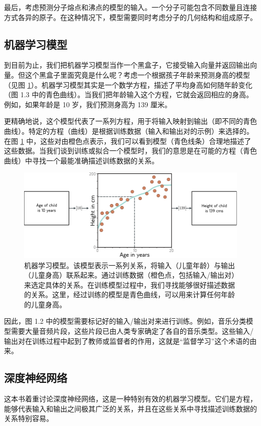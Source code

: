 \documentclass[lang=cn,newtx,10pt,scheme=chinese]{elegantbook}
\begin{document}
最后，考虑预测分子熔点和沸点的模型的输入。一个分子可能包含不同数量且连接方式各异的原子。在这种情况下，模型需要同时考虑分子的几何结构和组成原子。

\subsection{机器学习模型}
到目前为止，我们把机器学习模型当作一个黑盒子，它接受输入向量并返回输出向量。但这个黑盒子里面究竟是什么呢？考虑一个根据孩子年龄来预测身高的模型（见图 \ref{IntroAgeHeight}）。机器学习模型其实是一个数学方程，描述了平均身高如何随年龄变化（图 1.3 中的青色曲线）。当我们把年龄输入这个方程，它就会返回相应的身高。例如，如果年龄是 10 岁，我们预测身高为 139 厘米。

更精确地说，这个模型代表了一系列方程，用于将输入映射到输出（即不同的青色曲线）。特定的方程（曲线）是根据训练数据（输入和输出对的示例）来选择的。在图 \ref{IntroAgeHeight} 中，这些对由橙色点表示，我们可以看到模型（青色线条）合理地描述了这些数据。当我们谈到训练或拟合一个模型时，我们的意思是在可能的方程（青色曲线）中寻找一个最能准确描述训练数据的关系。

\begin{figure}
	\centering
	\includegraphics[width=0.7\linewidth]{PDFFigures/UDLChap1PDF/IntroAgeHeight.pdf}
	\caption{机器学习模型。该模型表示一系列关系，将输入（儿童年龄）与输出（儿童身高）联系起来。通过训练数据（橙色点，包括输入/输出对）来选定具体的关系。在训练模型过程中，我们寻找能够很好描述数据的关系。这里，经过训练的模型是青色曲线，可以用来计算任何年龄的儿童身高。}
  \label{IntroAgeHeight}
\end{figure}

因此，图 1.2 中的模型需要标记好的输入/输出对来进行训练。例如，音乐分类模型需要大量音频片段，这些片段已由人类专家确定了各自的音乐类型。这些输入/输出对在训练过程中起到了教师或监督者的作用，这就是“监督学习”这个术语的由来。

\subsection{深度神经网络}
这本书着重讨论深度神经网络，这是一种特别有效的机器学习模型。它们是方程，能够代表输入和输出之间极其广泛的关系，并且在这些关系中寻找描述训练数据的关系特别容易。
\end{document}
